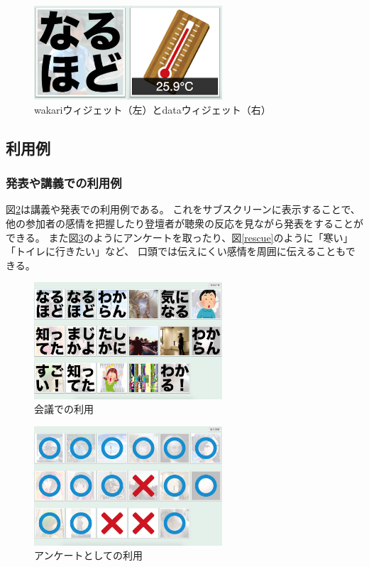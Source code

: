 \begin{figure}[h]
\centering
\includegraphics[width=7cm]{images/widget.eps}
\caption{wakariウィジェット（左）とdataウィジェット（右）}
\label{widget}
\end{figure}

\subsection{利用例}

\subsubsection{発表や講義での利用例}

図\ref{discussion}は講義や発表での利用例である。
これをサブスクリーンに表示することで、他の参加者の感情を把握したり登壇者が聴衆の反応を見ながら発表をすることができる。
また図\ref{vote}のようにアンケートを取ったり、図\ref{rescue}のように「寒い」「トイレに行きたい」など、
口頭では伝えにくい感情を周囲に伝えることもできる。

\begin{figure}[h]
\centering
\includegraphics[width=7cm]{images/discussion.eps}
\caption{会議での利用}
\label{discussion}
\end{figure}

\begin{figure}[h]
\centering
\includegraphics[width=7cm]{images/vote.eps}
\caption{アンケートとしての利用}
\label{vote}
\end{figure}

